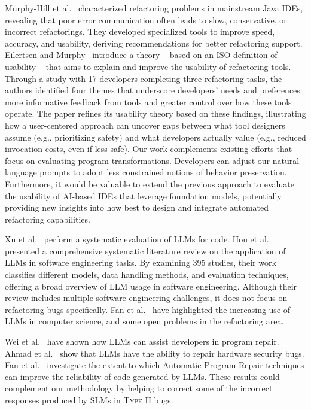 Murphy-Hill et al.~\cite{Murphy-Hill-icse-2008} characterized refactoring problems in mainstream Java IDEs, revealing that poor error communication often leads to slow, conservative, or incorrect refactorings. They developed specialized tools to improve speed, accuracy, and usability, deriving recommendations for better refactoring support. 
Eilertsen and Murphy~\cite{refactoring-usability} introduce a theory -- based on an ISO definition of usability -- that aims to explain and improve the usability of refactoring tools. Through a study with 17 developers completing three refactoring tasks, the authors identified four themes that underscore developers' needs and preferences: more informative feedback from tools and greater control over how these tools operate. The paper refines its usability theory based on these findings, illustrating how a user-centered approach can uncover gaps between what tool designers assume (e.g., prioritizing safety) and what developers actually value (e.g., reduced invocation costs, even if less safe).
Our work complements existing efforts that focus on evaluating program transformations. Developers can adjust our natural-language prompts to adopt less constrained notions of behavior preservation. Furthermore, it would be valuable to extend the previous approach to evaluate the usability of AI-based IDEs that leverage foundation models, potentially providing new insights into how best to design and integrate automated refactoring capabilities.


Xu et al.~\cite{DBLP:conf/pldi/Xu0NH22} perform a systematic evaluation of LLMs for code. Hou et al.~\cite{se-llms-2023} presented a comprehensive systematic literature review on the application of LLMs in software engineering tasks. By examining 395 studies, their work classifies different models, data handling methods, and evaluation techniques, offering a broad overview of LLM usage in software engineering. Although their review includes multiple software engineering  challenges, it does not focus on refactoring bugs specifically. 
Fan et al.~\cite{DBLP:conf/fose-ws/FanGHLSYZ23} have highlighted the increasing use of LLMs in computer science, and some open problems in the refactoring area. 

Wei et al.~\cite{DBLP:conf/sigsoft/0003X023} have shown how LLMs can assist developers in program repair.
Ahmad et al.~\cite{DBLP:journals/tifs/AhmadTTKP24} show that LLMs have the ability to repair hardware security bugs.
Fan et al.~\cite{DBLP:conf/icse/FanGMRT23} investigate the extent to which Automatic Program Repair techniques can improve the reliability of code generated by LLMs. These results could complement our methodology by helping to correct some of the incorrect responses produced by SLMs in \textsc{Type II} bugs.

